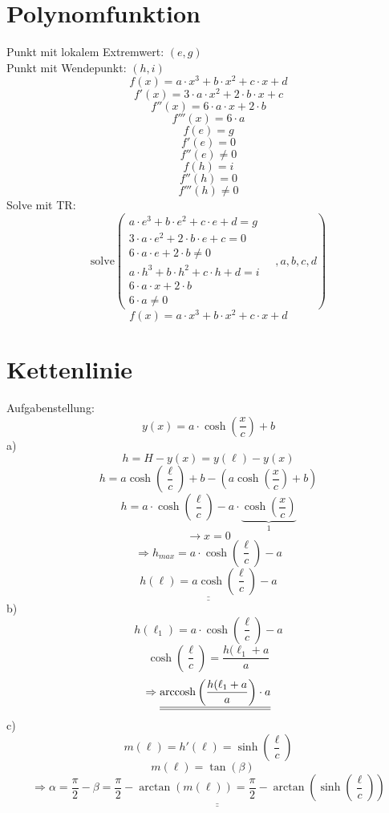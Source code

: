 \section{Polynomfunktion}
Punkt mit lokalem Extremwert: $(e,g)$\\
Punkt mit Wendepunkt: $(h,i)$
\[f(x) = a \cdot x^3 + b \cdot x^2 + c \cdot x + d\]
\[f'(x) = 3 \cdot a \cdot x^2 + 2 \cdot b \cdot x + c\]
\[f''(x) = 6 \cdot a \cdot x + 2 \cdot b\]
\[f'''(x) = 6 \cdot a\]
\[f(e) = g\]
\[f'(e) = 0\]
\[f''(e) \neq 0\]
\[f(h) = i\]
\[f''(h) = 0\]
\[f'''(h) \neq 0\]
Solve mit TR:
\[\text{solve}\left(\begin{matrix}
a \cdot e^3 + b \cdot e^2 + c \cdot e + d = g\\
3 \cdot a \cdot e^2 + 2 \cdot b \cdot e + c = 0\\
6 \cdot a \cdot e + 2 \cdot b \neq 0\\
a \cdot h^3 + b \cdot h^2 + c \cdot h + d = i\\
6 \cdot a \cdot x + 2 \cdot b\\
6 \cdot a \neq 0
\end{matrix} \quad ,a,b,c,d\right)\]
\[f(x) = a \cdot x^3 + b \cdot x^2 + c \cdot x + d\]

\section{Kettenlinie}
Aufgabenstellung: 
\[y(x) = a \cdot \cosh\left(\frac{x}{c}\right) + b\]
a)\\
\[h = H - y(x) = y(\ell) - y(x)\]
\[h = a \cosh\left(\frac{\ell}{c}\right) + b - \left(a \cosh\left(\frac{x}{c}\right) + b\right)\]
\[h = a \cdot \cosh\left(\frac{\ell}{c}\right) - a \cdot \underbrace{\cosh\left(\frac{x}{c}\right)}_1\]
\[\rightarrow x = 0\]
\[\Rightarrow h_{max} = a \cdot \cosh\left(\frac{\ell}{c}\right)-a\]
\[\underline{\underline{h(\ell) = a \cosh\left(\frac{\ell}{c}\right) - a}}\]
b)
\[h(\ell_1) =a \cdot \cosh\left(\frac{\ell}{c}\right) - a\]
\[\cosh\left(\frac{\ell}{c}\right) = \frac{h(\ell_1 + a}{a}\]
\[\Rightarrow \underline{\underline{\operatorname{arccosh}\left(\frac{h(\ell_1 + a}{a}\right) \cdot a}}\]
c)
\[m(\ell) = h'(\ell) = \sinh\left(\frac{\ell}{c}\right)\]
\[m(\ell) = \tan(\beta) \quad\]
\[\Rightarrow \underline{\underline{\alpha = \frac{\pi}{2} - \beta = \frac{\pi}{2} - \arctan(m(\ell)) = \frac{\pi}{2} - \arctan\left(\sinh\left(\frac{\ell}{c}\right)\right)}}\]

